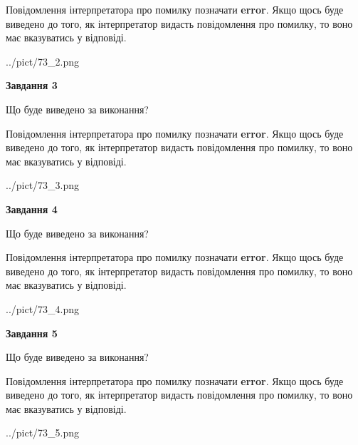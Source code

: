 \documentclass[12pt, ukrainian]{article}
\begin{document}
{\begin {large}
Повідомлення інтерпретатора про помилку позначати \textbf{error}.
Якщо щось буде виведено до того, як інтерпретатор видасть повідомлення про помилку, 
то воно має вказуватись у відповіді. \par


\begin{center}
	{../pict/73_2.png}
\end{center}
\newpage

{\begin {center}\textbf{Завдання 3}\end {center}}\par
Що буде виведено за виконання?

Повідомлення інтерпретатора про помилку позначати \textbf{error}.
Якщо щось буде виведено до того, як інтерпретатор видасть повідомлення про помилку, 
то воно має вказуватись у відповіді. \par


\begin{center}
	{../pict/73_3.png}
\end{center}
\newpage

{\begin {center}\textbf{Завдання 4}\end {center}}\par
Що буде виведено за виконання?

Повідомлення інтерпретатора про помилку позначати \textbf{error}.
Якщо щось буде виведено до того, як інтерпретатор видасть повідомлення про помилку, 
то воно має вказуватись у відповіді. \par


\begin{center}
	{../pict/73_4.png}
\end{center}
\newpage

{\begin {center}\textbf{Завдання 5}\end {center}}\par
Що буде виведено за виконання?

Повідомлення інтерпретатора про помилку позначати \textbf{error}.
Якщо щось буде виведено до того, як інтерпретатор видасть повідомлення про помилку, 
то воно має вказуватись у відповіді. \par


\begin{center}
	{../pict/73_5.png}
\end{center}
\newpage


\end{large}}
\end{document}
